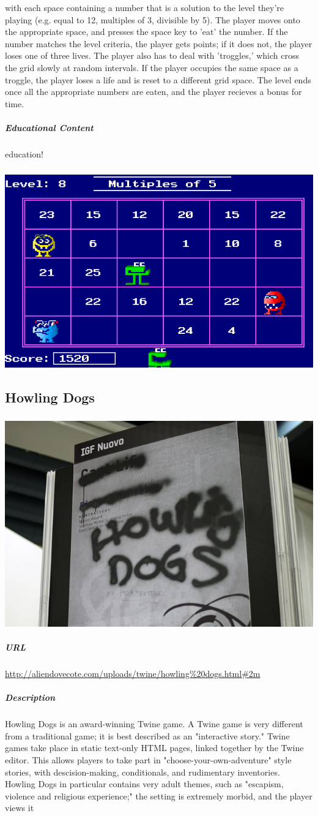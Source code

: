 with each space containing a number that is a solution to the level they're playing (e.g. equal to 12, multiples of 3, divisible by 5). The player moves onto the appropriate space, and presses the space key to 'eat' the number. If the number matches the level criteria, the player gets points; if it does not, the player loses one of three lives. The player also has to deal with 'troggles,' which cross the grid slowly at random intervals. If the player occupies the same space as a troggle, the player loses a life and is reset to a different grid space. The level ends once all the appropriate numbers are eaten, and the player recieves a bonus for time.\subparagraph{Educational Content}education!\subparagraph{}\includegraphics[width = \textwidth]{img/munchers_screen.png}\newpage\subsection{Howling Dogs}\subparagraph{}\includegraphics[width = \textwidth]{img/dogs_title.jpg}\subparagraph{URL}\url{http://aliendovecote.com/uploads/twine/howling%20dogs.html#2m}\subparagraph{Description}Howling Dogs is an award-winning Twine game. A Twine game is very different from a traditional game; it is best described as an "interactive story." Twine games take place in static text-only HTML pages, linked together by the Twine editor. This allows players to take part in "choose-your-own-adventure" style stories, with descision-making, conditionals, and rudimentary inventories. Howling Dogs in particular contains very adult themes, such as "escapism, violence and religious experience;" the setting is extremely morbid, and the player views it 